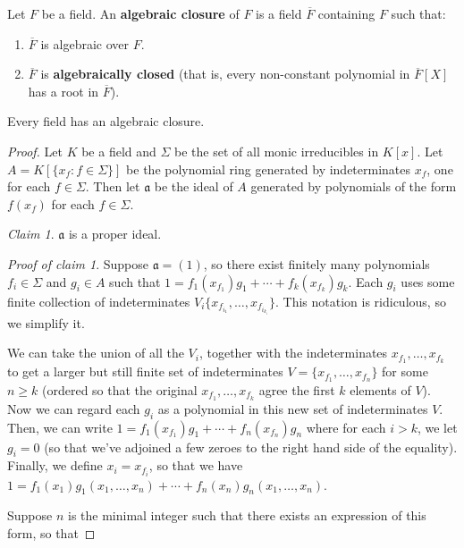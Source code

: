 \begin{definition} 
Let $F$ be a field. An \textbf{algebraic closure} of $F$ is a field
$\overline{F}$ containing $F$ such that:
\begin{enumerate}[\textbf{AC} 1]
\item $\overline{F} $ is algebraic over $F$.
\item $\overline{F}$ is \textbf{algebraically closed} (that is, every
non-constant polynomial in $\overline{F}[X]$ has a root in $\overline{F}$).
\end{enumerate}
\end{definition} 

\begin{theorem}
Every field has an algebraic closure.
\end{theorem}

\begin{proof}
Let $ K$ be a field and $ \Sigma$ be the set of all monic irreducibles in $ K[x]$. Let $ A = K[\{x_f : f \in \Sigma\}]$ be the polynomial ring generated by indeterminates $ x_f$, one for each $ f \in \Sigma$. Then let $ \mathfrak{a}$ be the ideal of $ A$ generated by polynomials of the form $ f(x_f)$ for each $ f \in \Sigma$.

\emph{Claim 1}. $ \mathfrak{a}$ is a proper ideal.

\emph{Proof of claim 1}. Suppose $ \mathfrak{a} = (1)$, so there exist finitely many polynomials $ f_i \in \Sigma$ and $ g_i \in A$ such that $ 1 = f_1(x_{f_1}) g_1 + \dotsb + f_k(x_{f_k}) g_k$. Each $ g_i$ uses some finite collection of indeterminates $ V_i \{x_{f_{i_1}}, \dotsc, x_{f_{i_{k_i}}}\}$. This notation is ridiculous, so we simplify it.

We can take the union of all the $ V_i$, together with the indeterminates $ x_{f_1}, \dotsc, x_{f_k}$ to get a larger but still finite set of indeterminates $ V = \{x_{f_1}, \dotsc, x_{f_n}\}$ for some $ n \geq k$ (ordered so that the original $ x_{f_1}, \dotsc, x_{f_k}$ agree the first $ k$ elements of $ V$). Now we can regard each $ g_i$ as a polynomial in this new set of indeterminates $ V$.
Then, we can write $ 1 = f_1(x_{f_1}) g_1 + \dotsb + f_n(x_{f_n}) g_n$ where for each $ i > k$, we let $ g_i = 0$ (so that we've adjoined a few zeroes to the right hand side of the equality).
Finally, we define $ x_i = x_{f_i}$, so that we have
$ 1 = f_1(x_1)g_1(x_1, \dotsc, x_n) + \dotsb + f_n(x_n) g_n(x_1, \dotsc, x_n)$.

Suppose $ n$ is the minimal integer such that there exists an expression of this form, so that


\end{proof}
